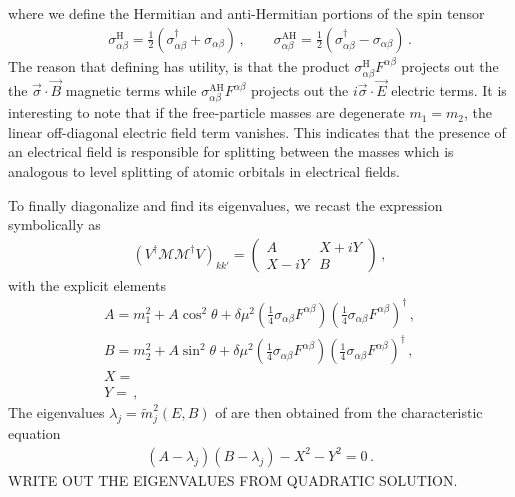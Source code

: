 where we define the Hermitian and anti-Hermitian portions of the spin tensor
\begin{align}
    \label{antiherm:1}
    \sigma_{\alpha\beta}^\mathrm{H}=\frac{1}{2}\left(\sigma_{\alpha\beta}^{\dag} + \sigma_{\alpha\beta}\right)\,,\qquad
    \sigma_{\alpha\beta}^\mathrm{AH}=\frac{1}{2}\left(\sigma_{\alpha\beta}^{\dag} - \sigma_{\alpha\beta}\right)\,.
\end{align}
The reason that defining  has utility, is that the product $\sigma_{\alpha\beta}^\mathrm{H}F^{\alpha\beta}$ projects out the the $\vec{\sigma}\cdot\vec{B}$ magnetic terms while $\sigma_{\alpha\beta}^\mathrm{AH}F^{\alpha\beta}$ projects out the $i\vec{\sigma}\cdot\vec{E}$ electric terms. It is interesting to note that if the free-particle masses are degenerate $m_{1}=m_{2}$, the linear off-diagonal electric field term vanishes. This indicates that the presence of an electrical field is responsible for splitting between the masses which is analogous to level splitting of atomic orbitals in electrical fields.

To finally diagonalize  and find its eigenvalues, we recast the expression symbolically as
\begin{align}
    \label{hermz:5}
    (V^{\dag}\mathcal{M}\mathcal{M}^{\dag}V)_{kk'} =
    \begin{pmatrix}
        A & X+iY\\
        X-iY & B
    \end{pmatrix}\,,
\end{align}
with the explicit elements
\begin{align}
    A = m_{1}^{2}+A\cos^{2}\theta+\delta\mu^{2}\left(\frac{1}{4}\sigma_{\alpha\beta}F^{\alpha\beta}\right)\left(\frac{1}{4}\sigma_{\alpha\beta}F^{\alpha\beta}\right)^{\dag}\,,\\
    B = m_{2}^{2}+A\sin^{2}\theta+\delta\mu^{2}\left(\frac{1}{4}\sigma_{\alpha\beta}F^{\alpha\beta}\right)\left(\frac{1}{4}\sigma_{\alpha\beta}F^{\alpha\beta}\right)^{\dag}\,,\\
    X = \\
    Y =\,,
\end{align}
The eigenvalues $\lambda_{j}=\widetilde m_{j}^{2}(E,B)$ of  are then obtained from the characteristic equation
\begin{align}
    (A-\lambda_{j})(B-\lambda_{j})-X^{2}-Y^{2}=0\,.
\end{align}
WRITE OUT THE EIGENVALUES FROM QUADRATIC SOLUTION.